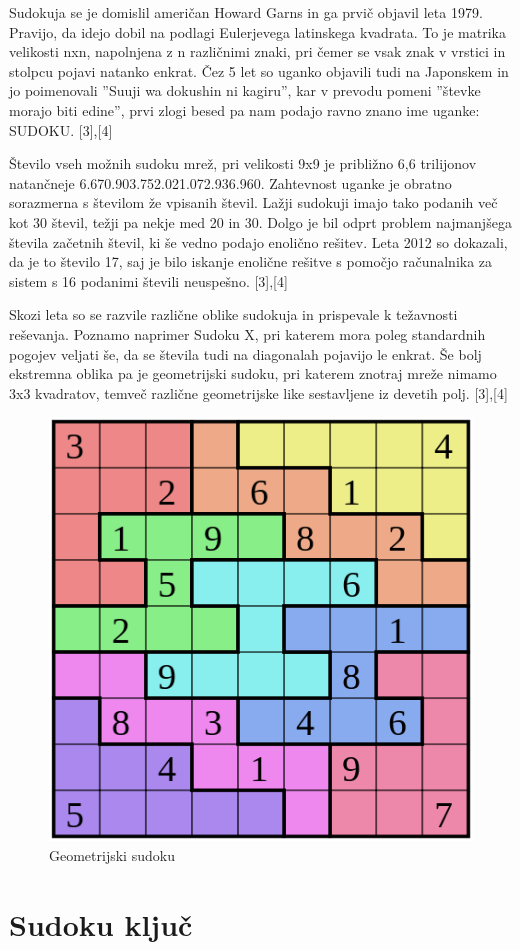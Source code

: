 \documentclass[A4paper, 11pt]{article}
\begin{document}
Sudokuja se je domislil američan Howard Garns in ga prvič objavil leta 1979. Pravijo, da idejo dobil na podlagi Eulerjevega latinskega kvadrata. To je matrika velikosti nxn, napolnjena z n različnimi znaki, pri čemer se vsak znak v vrstici in stolpcu pojavi natanko enkrat. Čez 5 let so uganko objavili tudi na Japonskem in jo poimenovali ''Suuji wa dokushin ni kagiru'', kar v prevodu pomeni ''števke morajo biti edine'', prvi zlogi besed pa nam podajo ravno znano ime uganke: SUDOKU. [3],[4]


Število vseh možnih sudoku mrež, pri velikosti 9x9 je približno 6,6 trilijonov natančneje 6.670.903.752.021.072.936.960. 
Zahtevnost uganke je obratno sorazmerna s številom že vpisanih števil. Lažji sudokuji imajo tako podanih več kot 30 števil, težji pa nekje med 20 in 30. Dolgo je bil odprt problem najmanjšega števila začetnih števil, ki še vedno podajo enolično rešitev. Leta 2012 so dokazali, da je to število 17, saj je bilo iskanje enolične rešitve s pomočjo računalnika za sistem s 16 podanimi števili neuspešno. [3],[4]

Skozi leta so se razvile različne oblike sudokuja in prispevale k težavnosti reševanja. Poznamo naprimer Sudoku X, pri katerem mora poleg standardnih pogojev veljati še, da se števila tudi na diagonalah pojavijo le enkrat. Še bolj ekstremna oblika pa je geometrijski sudoku, pri katerem znotraj mreže nimamo 3x3 kvadratov, temveč različne geometrijske like sestavljene iz devetih polj. [3],[4]

\begin{figure}[h]
\centering
\caption{Geometrijski sudoku}
\includegraphics[scale=0.4]{geo_sudoku}
\end{figure}


\section{Sudoku ključ}
\end{document}

